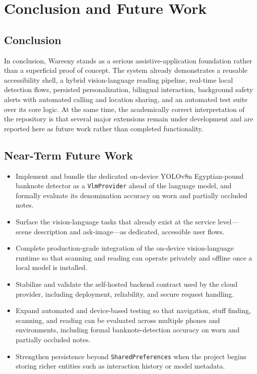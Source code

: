 \documentclass[a4paper]{report}
\begin{document}
\section{Conclusion and Future Work}
\subsection{Conclusion}
In conclusion, Wareeny stands as a serious assistive-application foundation rather than a superficial proof of concept. The system already demonstrates a reusable accessibility shell, a hybrid vision-language reading pipeline, real-time local detection flows, persisted personalization, bilingual interaction, background safety alerts with automated calling and location sharing, and an automated test suite over its core logic. At the same time, the academically correct interpretation of the repository is that several major extensions remain under development and are reported here as future work rather than completed functionality.

\subsection{Near-Term Future Work}
\begin{itemize}
  \item Implement and bundle the dedicated on-device YOLOv8n Egyptian-pound banknote detector as a \texttt{VlmProvider} ahead of the language model, and formally evaluate its denomination accuracy on worn and partially occluded notes.
  \item Surface the vision-language tasks that already exist at the service level---scene description and ask-image---as dedicated, accessible user flows.
  \item Complete production-grade integration of the on-device vision-language runtime so that scanning and reading can operate privately and offline once a local model is installed.
  \item Stabilize and validate the self-hosted backend contract used by the cloud provider, including deployment, reliability, and secure request handling.
  \item Expand automated and device-based testing so that navigation, stuff finding, scanning, and reading can be evaluated across multiple phones and environments, including formal banknote-detection accuracy on worn and partially occluded notes.
  \item Strengthen persistence beyond \texttt{SharedPreferences} when the project begins storing richer entities such as interaction history or model metadata.
\end{itemize}
\end{document}
